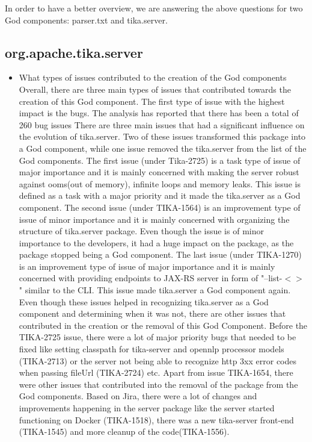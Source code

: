 \documentclass{article}
\begin{document}
In order to have a better overview, we are answering the above questions for two God components: parser.txt and tika.server.\\
\subsection{org.apache.tika.server}
\begin{itemize}
    \item What types of issues contributed to the creation of the God components\\
    Overall, there are three main types of issues that contributed towards the creation of this God component. The first type of issue with the highest impact is the bugs. The analysis has reported that there has been a total of 260 bug issues
    There are three main issues that had a significant influence on the evolution of tika.server. Two of these issues transformed this package into a God component, while one issue removed the tika.server from the list of the God components. The first issue (under Tika-2725) is a task type of issue of major importance and it is mainly concerned with making the server robust against ooms(out of memory), infinite loops and memory leaks. This issue is defined as a task with a major priority and it made the tika.server as a God component. The second issue (under TIKA-1564) is an improvement type of issue of minor importance and it is mainly concerned with organizing the structure of tika.server package. Even though the issue is of minor importance to the developers, it had a huge impact on the package, as the package stopped being a God component. The last issue (under TIKA-1270) is an improvement type of issue of major importance and it is mainly concerned with providing endpoints to JAX-RS server in form of "--list-$<>$" similar to the CLI. This issue made tika.server a God component again.\\
    Even though these issues helped in recognizing tika.server as a God component and determining when it was not, there are other issues that contributed in the creation or the removal of this God Component. Before the TIKA-2725 issue, there were a lot of major priority bugs that needed to be fixed like setting classpath for tika-server and opennlp processor models (TIKA-2713) or the server not being able to recognize http 3xx error codes when passing fileUrl (TIKA-2724) etc. Apart from issue TIKA-1654, there were other issues that contributed into the removal of the package from the God components. Based on Jira, there were a lot of changes and improvements happening in the server package like the server started functioning on Docker (TIKA-1518), there was a new tika-server front-end (TIKA-1545) and more cleanup of the code(TIKA-1556).

\end{itemize}
\end{document}
